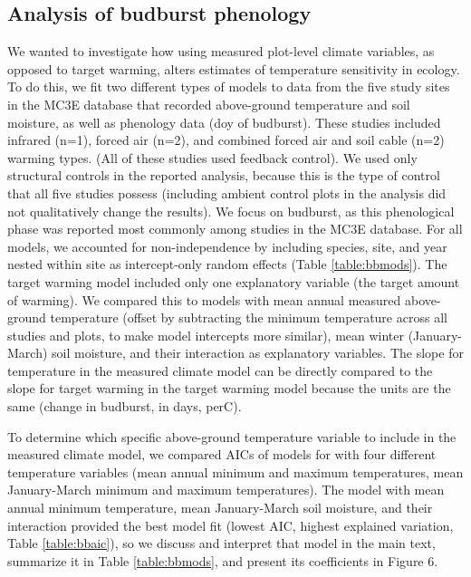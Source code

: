 \documentclass{article}
\begin{document}
\subsection* {Analysis of budburst phenology}
We wanted to investigate how using measured plot-level climate variables, as opposed to target warming, alters estimates of temperature sensitivity in ecology. To do this, we fit two different types of models to data from the five study sites in the MC3E database that recorded above-ground temperature and soil moisture, as well as phenology data (doy of budburst). These studies included infrared (n=1), forced air (n=2), and combined forced air and soil cable (n=2) warming types. (All of these studies used feedback control). We used only structural controls in the reported analysis, because this is the type of control that all five studies possess (including ambient control plots in the analysis did not qualitatively change the results). We focus on budburst, as this phenological phase was reported most commonly among studies in the MC3E database. For all models, we accounted for non-independence by including species, site, and year nested within site as intercept-only random effects (Table \ref{table:bbmods}). The target warming model included only one explanatory variable (the target amount of warming).  We compared this to models with mean annual measured above-ground temperature (offset by subtracting the minimum temperature across all studies and plots, to make model intercepts more similar), mean winter (January-March) soil moisture, and their interaction as explanatory variables. The slope for temperature in the measured climate model can be directly compared to the slope for target warming in the target warming model because the units are the same (change in budburst, in days, per\degree C).
\par To determine which specific above-ground temperature variable to include in the measured climate model, we compared AICs of models for with four different temperature variables (mean annual minimum and maximum temperatures, mean January-March minimum and maximum temperatures). The model with mean annual minimum temperature, mean January-March soil moisture, and their interaction provided the best model fit (lowest AIC, highest explained variation, Table \ref{table:bbaic}), so we discuss and interpret that model in the main text, summarize it in Table \ref{table:bbmods}, and present its coefficients in Figure 6. 


\clearpage
\end{document}

